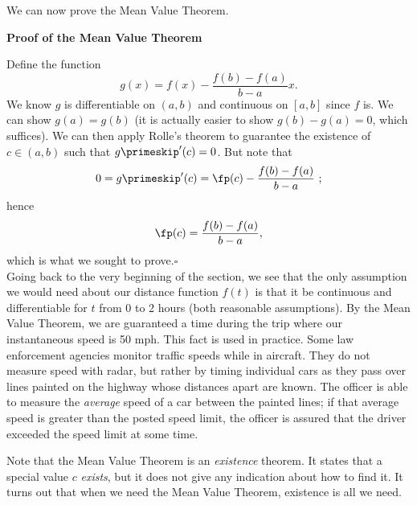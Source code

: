 We can now prove the Mean Value Theorem.\\

\pagebreak

\noindent\textbf{Proof of the Mean Value Theorem}

Define the function 
\[
g(x) = f(x) - \frac{f(b)-f(a)}{b-a}x.
\]
We know $g$ is differentiable on $(a,b)$ and  continuous on $[a,b]$ since $f$ is. We can show $g(a)=g(b)$ (it is actually easier to show $g(b)-g(a)=0$, which suffices). We can then apply Rolle's theorem to guarantee the existence of $c \in (a,b)$ such that $g\primeskip'(c) = 0$.  But note that 
\[
0= g\primeskip'(c) = \fp(c) - \frac{f(b)-f(a)}{b-a} \ ;
\]
 hence 
 \[
 \fp(c) = \frac{f(b)-f(a)}{b-a},
 \]
which is what we sought to prove.\hfill $\square$\\

Going back to the very beginning of the section, we see that the only assumption we would need about our distance function $f(t)$ is that it be continuous and differentiable for $t$ from 0 to 2 hours (both reasonable assumptions).  By the Mean Value Theorem, we are guaranteed a time during the trip where our instantaneous speed is 50 mph. This fact is used in practice. Some law enforcement agencies monitor traffic speeds while in aircraft. They do not measure speed with radar, but rather by timing individual cars as they pass over lines painted on the highway whose distances apart are known. The officer is able to measure the \textit{average} speed of a car between the painted lines; if that average speed is greater than the posted speed limit, the officer is assured that the driver exceeded the speed limit at some time.

Note that the Mean Value Theorem is an \textit{existence} theorem. It states that a special value $c$ \textit{exists}, but it does not give any indication about how to find it. It turns out that when we need the Mean Value Theorem, existence is all we need.\\

